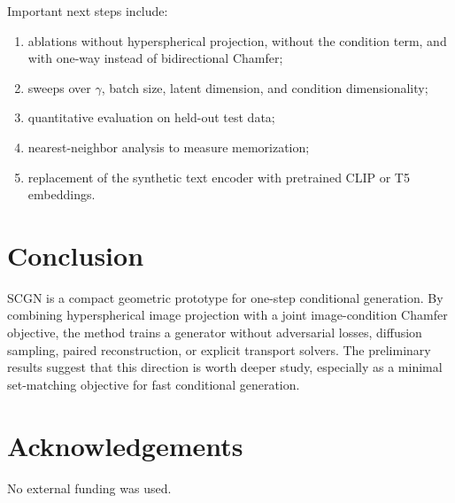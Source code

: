 \documentclass[11pt]{article}
\begin{document}
Important next steps include:
\begin{enumerate}
    \item ablations without hyperspherical projection, without the condition
    term, and with one-way instead of bidirectional Chamfer;
    \item sweeps over $\gamma$, batch size, latent dimension, and condition
    dimensionality;
    \item quantitative evaluation on held-out test data;
    \item nearest-neighbor analysis to measure memorization;
    \item replacement of the synthetic text encoder with pretrained CLIP or T5
    embeddings.
\end{enumerate}

\section{Conclusion}
SCGN is a compact geometric prototype for one-step conditional generation. By
combining hyperspherical image projection with a joint image-condition Chamfer
objective, the method trains a generator without adversarial losses, diffusion
sampling, paired reconstruction, or explicit transport solvers. The preliminary
results suggest that this direction is worth deeper study, especially as a
minimal set-matching objective for fast conditional generation.

\section*{Acknowledgements}
No external funding was used.



\end{document}
